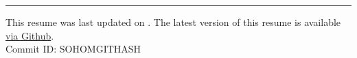 \documentclass{resume} %
\begin{document}
\hrule
\small This resume was last updated on \DTMnow. The latest version of this resume is available \href{https://sohomdatta1.github.io/cv/artifacts/cv.pdf}{via Github}.\\
\color{white} Commit ID: SOHOMGITHASH\\
\end{document}
